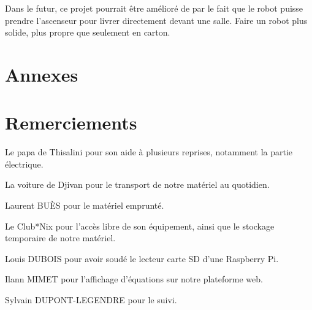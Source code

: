 \documentclass[a4paper,12pt]{report}  %
\begin{document}
Dans le futur, ce projet pourrait être amélioré de par le fait que le robot puisse prendre l’ascenseur pour livrer directement devant une salle. Faire un robot plus solide, plus propre que seulement en carton.


\section{Annexes}

\section{Remerciements}
Le papa de Thisalini pour son aide à plusieurs reprises, notamment la partie électrique.

La voiture de Djivan pour le transport de notre matériel au quotidien. 

Laurent BUÈS pour le matériel emprunté. 

Le Club*Nix pour l’accès libre de son équipement, ainsi que le stockage temporaire de notre matériel. 

Louis DUBOIS pour avoir soudé le lecteur carte SD d’une Raspberry Pi. 

Ilann MIMET pour l’affichage d’équations sur notre plateforme web. 

Sylvain DUPONT-LEGENDRE pour le suivi. 
\end{document}
